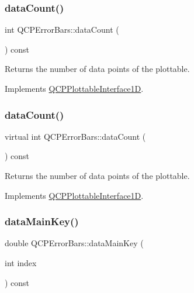 \subsubsection{\texorpdfstring{data\+Count()}{dataCount()}\hspace{0.1cm}{\footnotesize\ttfamily [1/2]}}
{\footnotesize\ttfamily int Q\+C\+P\+Error\+Bars\+::data\+Count (\begin{DoxyParamCaption}{ }\end{DoxyParamCaption}) const\hspace{0.3cm}{\ttfamily [virtual]}}

Returns the number of data points of the plottable. 

Implements \hyperlink{class_q_c_p_plottable_interface1_d_a058a22c770ef4d5a0e878a7f02183da9}{Q\+C\+P\+Plottable\+Interface1D}.

\mbox{\label{class_q_c_p_error_bars_ad483ac705b62f3c16dc2c6c1627d22d9}} 
\subsubsection{\texorpdfstring{data\+Count()}{dataCount()}\hspace{0.1cm}{\footnotesize\ttfamily [2/2]}}
{\footnotesize\ttfamily virtual int Q\+C\+P\+Error\+Bars\+::data\+Count (\begin{DoxyParamCaption}{ }\end{DoxyParamCaption}) const\hspace{0.3cm}{\ttfamily [virtual]}}

Returns the number of data points of the plottable. 

Implements \hyperlink{class_q_c_p_plottable_interface1_d_a058a22c770ef4d5a0e878a7f02183da9}{Q\+C\+P\+Plottable\+Interface1D}.

\mbox{\label{class_q_c_p_error_bars_ae3931213f76cd34a824c42c22a1dca74}} 
\subsubsection{\texorpdfstring{data\+Main\+Key()}{dataMainKey()}\hspace{0.1cm}{\footnotesize\ttfamily [1/2]}}
{\footnotesize\ttfamily double Q\+C\+P\+Error\+Bars\+::data\+Main\+Key (\begin{DoxyParamCaption}\item[{int}]{index }\end{DoxyParamCaption}) const\hspace{0.3cm}{\ttfamily [virtual]}}

